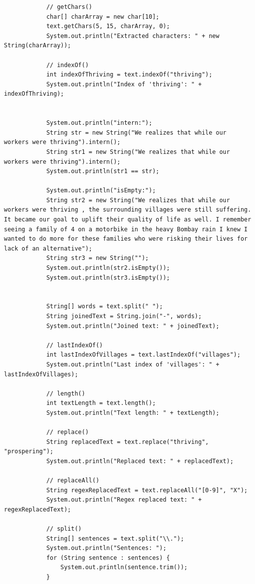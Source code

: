 \documentclass{article}
\begin{document}
\begin{lstlisting}
            // getChars()
            char[] charArray = new char[10];
            text.getChars(5, 15, charArray, 0);
            System.out.println("Extracted characters: " + new String(charArray));
    
            // indexOf()
            int indexOfThriving = text.indexOf("thriving");
            System.out.println("Index of 'thriving': " + indexOfThriving);
    
            
            System.out.println("intern:");
            String str = new String("We realizes that while our workers were thriving").intern();  
            String str1 = new String("We realizes that while our workers were thriving").intern();  
            System.out.println(str1 == str);
    
            System.out.println("isEmpty:");
            String str2 = new String("We realizes that while our workers were thriving , the surrounding villages were still suffering. It became our goal to uplift their quality of life as well. I remember seeing a family of 4 on a motorbike in the heavy Bombay rain I knew I wanted to do more for these families who were risking their lives for lack of an alternative");  
            String str3 = new String("");
            System.out.println(str2.isEmpty());
            System.out.println(str3.isEmpty());
    
            
            String[] words = text.split(" ");
            String joinedText = String.join("-", words);
            System.out.println("Joined text: " + joinedText);
    
            // lastIndexOf()
            int lastIndexOfVillages = text.lastIndexOf("villages");
            System.out.println("Last index of 'villages': " + lastIndexOfVillages);
    
            // length()
            int textLength = text.length();
            System.out.println("Text length: " + textLength);
    
            // replace()
            String replacedText = text.replace("thriving", "prospering");
            System.out.println("Replaced text: " + replacedText);
    
            // replaceAll()
            String regexReplacedText = text.replaceAll("[0-9]", "X");
            System.out.println("Regex replaced text: " + regexReplacedText);
    
            // split()
            String[] sentences = text.split("\\.");
            System.out.println("Sentences: ");
            for (String sentence : sentences) {
                System.out.println(sentence.trim());
            }
    

\end{lstlisting}
\end{document}
